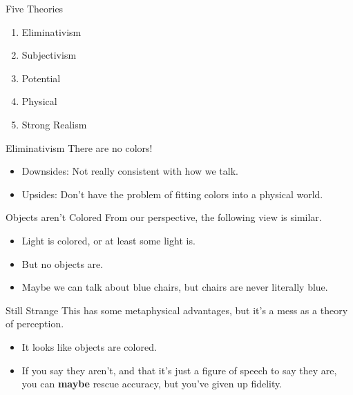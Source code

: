 \documentclass[
  17pt,
  letterpaper,
  ignorenonframetext,
  aspectratio=169,
]{beamer}
\providecommand{\tightlist}{%
  \setlength{\itemsep}{0pt}\setlength{\parskip}{0pt}}\usepackage{longtable,booktabs,array}
\begin{document}
\begin{frame}{Five Theories}
\protect\hypertarget{five-theories}{}
\begin{enumerate}[<+->]
\tightlist
\item
  Eliminativism
\item
  Subjectivism
\item
  Potential
\item
  Physical
\item
  Strong Realism
\end{enumerate}
\end{frame}

\begin{frame}{Eliminativism}
\protect\hypertarget{eliminativism}{}
There are no colors!

\begin{itemize}[<+->]
\tightlist
\item
  Downsides: Not really consistent with how we talk.
\item
  Upsides: Don't have the problem of fitting colors into a physical
  world.
\end{itemize}
\end{frame}

\begin{frame}{Objects aren't Colored}
\protect\hypertarget{objects-arent-colored}{}
From our perspective, the following view is similar.

\begin{itemize}[<+->]
\tightlist
\item
  Light is colored, or at least some light is.
\item
  But no objects are.
\item
  Maybe we can talk about blue chairs, but chairs are never literally
  blue.
\end{itemize}
\end{frame}

\begin{frame}{Still Strange}
\protect\hypertarget{still-strange}{}
This has some metaphysical advantages, but it's a mess as a theory of
perception.

\begin{itemize}[<+->]
\tightlist
\item
  It looks like objects are colored.
\item
  If you say they aren't, and that it's just a figure of speech to say
  they are, you can \textbf{maybe} rescue accuracy, but you've given up
  fidelity.
\end{itemize}
\end{frame}
\end{document}
